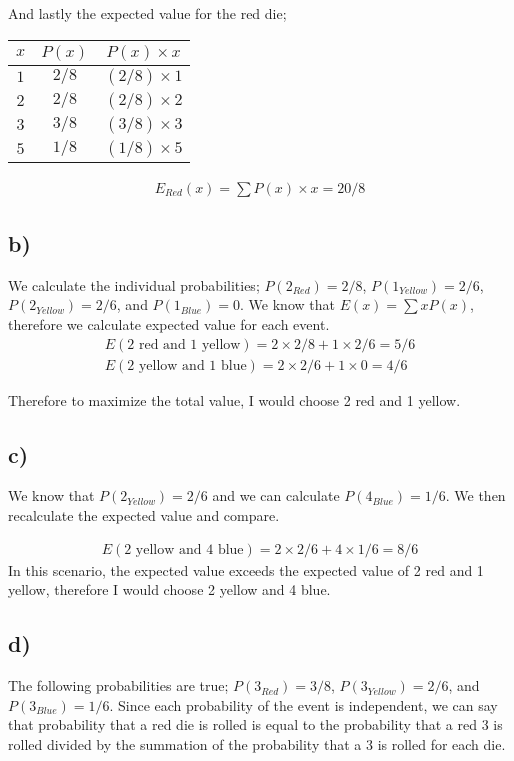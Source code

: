 \documentclass[12pt]{article}
\begin{document}
And lastly the expected value for the red die;
\begin{center}
    \begin{tabular}{ c | c | c}
        $x$ & $P(x)$ & $P(x) \times x$ \\ 
        \hline
        $1$ & $2/8$ & $(2/8) \times 1$ \\
        $2$ & $2/8$ & $(2/8) \times 2$ \\
        $3$ & $3/8$ & $(3/8) \times 3$ \\
        $5$ & $1/8$ & $(1/8) \times 5$ \\
    \end{tabular}
\end{center}

\begin{align*}
    E_{Red}(x) = \sum P(x)\times x = 20/8
\end{align*}


\subsection*{b)}
We calculate the individual probabilities;
$P(2_{Red}) = 2/8$, $P(1_{Yellow}) = 2/6$, $P(2_{Yellow}) = 2/6$, and
$P(1_{Blue}) = 0$. We know that $E(x) = \sum xP(x)$, therefore we calculate 
expected value for each event.
\begin{align*}
    E(\text{2 red and 1 yellow}) = 2 \times 2/8 + 1 \times 2/6 = 5/6 \\
    E(\text{2 yellow and 1 blue}) = 2 \times 2/6 + 1 \times 0 = 4/6
\end{align*}

Therefore to maximize the total value, I would choose 2 red and 1 yellow.

\subsection*{c)}
We know that $P(2_{Yellow}) = 2/6$ and we can calculate $P(4_{Blue}) = 1/6$.
We then recalculate the expected value and compare.

\begin{align*}
    E(\text{2 yellow and 4 blue}) = 2 \times 2/6 + 4 \times 1/6 = 8/6
\end{align*}
 In this scenario, the expected value exceeds the expected value of 2 red and 
 1 yellow, therefore I would choose 2 yellow and 4 blue. 

\subsection*{d)}
The following probabilities are true; $P(3_{Red}) = 3/8$, $P(3_{Yellow}) = 2/6$,
and $P(3_{Blue}) = 1/6$. Since each probability of the event is independent, 
we can say that probability that a red die is rolled is equal to the probability that
a red 3 is rolled divided by the summation of the probability that a 3 is rolled for each die.
\end{document}
